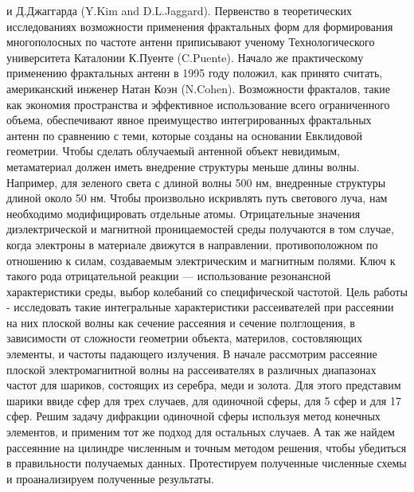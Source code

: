 и Д.Джаггарда (Y.Kim and D.L.Jaggard). Первенство в теоретических исследованиях возможности применения фрактальных форм для формирования многополосных по частоте антенн приписывают ученому Технологического университета Каталонии К.Пуенте (C.Puente). Начало же практическому применению фрактальных антенн в 1995 году положил, как принято считать, американский инженер Натан Коэн
(N.Cohen). Возможности фракталов, такие как экономия пространства и эффективное использование всего ограниченного объема, обеспечивают явное преимущество интегрированных фрактальных антенн по сравнению с теми, которые созданы на основании Евклидовой геометрии. 
Чтобы сделать облучаемый антенной объект невидимым, метаматериал должен иметь внедрение структуры меньше длины волны. Например, для зеленого света с длиной волны 500 нм, внедренные структуры длиной около 50 нм. Чтобы произвольно искривлять путь светового луча, нам необходимо модифицировать отдельные атомы. Отрицательные значения диэлектрической и магнитной проницаемостей среды получаются в том случае, когда электроны в материале движутся в направлении, противоположном по отношению к силам, создаваемым электрическим и магнитным полями. Ключ к такого рода отрицательной реакции — использование резонансной характеристики среды, выбор колебаний со специфической частотой. 
Цель работы - исследовать такие интегральные характеристики рассеивателей при рассеянии на них плоской волны как сечение рассеяния и сечение полглощения, в зависимости от сложности геометрии объекта, материлов, состовляющих элементы, и частоты падающего излучения. 
В начале рассмотрим рассеяние плоской электромагнитной волны на рассеивателях в различных диапазонах частот для шариков, состоящих из серебра, меди и золота. Для этого представим шарики ввиде сфер для трех случаев, для одиночной сферы, для 5 сфер и для 17 сфер. Решим задачу дифракции одиночной сферы используя метод конечных элементов, и применим тот же подход для остальных случаев. А так же найдем рассеянние на цилиндре численным и точным методом решения, чтобы убедиться в правильности получаемых данных. Протестируем полученные численные схемы и проанализируем полученные результаты.